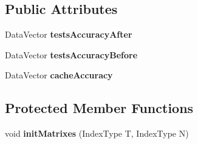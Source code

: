 \subsection*{Public Attributes}
\begin{DoxyCompactItemize}
\item 
\hypertarget{classffactory_1_1_stream_prox_cache_aff7b35796c283e88a783f16d5eae896a}{Data\-Vector {\bfseries tests\-Accuracy\-After}}\label{classffactory_1_1_stream_prox_cache_aff7b35796c283e88a783f16d5eae896a}

\item 
\hypertarget{classffactory_1_1_stream_prox_cache_a2527fa9f3c975e73de1989527417df92}{Data\-Vector {\bfseries tests\-Accuracy\-Before}}\label{classffactory_1_1_stream_prox_cache_a2527fa9f3c975e73de1989527417df92}

\item 
\hypertarget{classffactory_1_1_stream_prox_cache_aa92c97483f32ab90103e06901886129e}{Data\-Vector {\bfseries cache\-Accuracy}}\label{classffactory_1_1_stream_prox_cache_aa92c97483f32ab90103e06901886129e}

\end{DoxyCompactItemize}
\subsection*{Protected Member Functions}
\begin{DoxyCompactItemize}
\item 
\hypertarget{classffactory_1_1_stream_prox_cache_a4409c3023479022676712798218942d8}{void {\bfseries init\-Matrixes} (Index\-Type T, Index\-Type N)}\label{classffactory_1_1_stream_prox_cache_a4409c3023479022676712798218942d8}

\end{DoxyCompactItemize}

